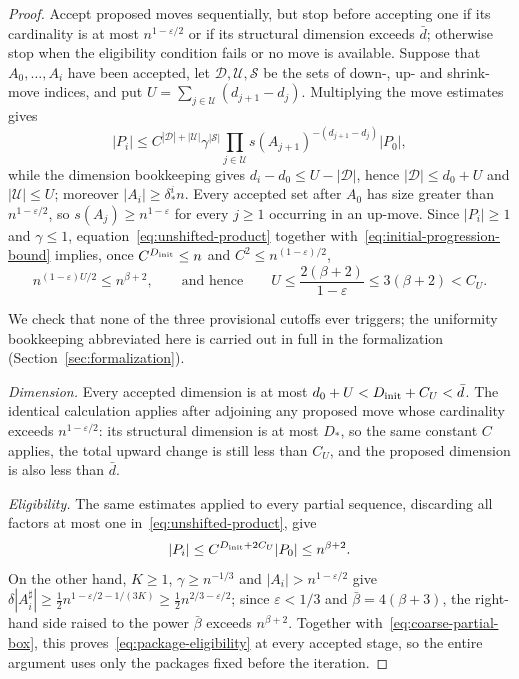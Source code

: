 \documentclass[11pt,reqno]{amsart}
\theoremstyle{definition}
\theoremstyle{remark}
\newcommand{\eps}{\varepsilon}
\begin{document}
\begin{proof}
Accept proposed moves sequentially, but stop before accepting one if its
cardinality is at most $n^{1-\eps/2}$ or if its structural dimension
exceeds $\bar d$; otherwise stop when the eligibility condition fails or
no move is available.  Suppose that $A_0,\dots,A_i$ have been accepted,
let $\mathcal D,\mathcal U,\mathcal S$ be the sets of down-, up- and
shrink-move indices, and put $U=\sum_{j\in\mathcal U}(d_{j+1}-d_j)$.
Multiplying the move estimates gives
\begin{equation}
\label{eq:unshifted-product}
 |P_i|
 \le C^{|\mathcal D|+|\mathcal U|}
 \gamma^{|\mathcal S|}
 \prod_{j\in\mathcal U}s(A_{j+1})^{-(d_{j+1}-d_j)}|P_0|,
\end{equation}
while the dimension bookkeeping gives $d_i-d_0\le U-|\mathcal D|$, hence
$|\mathcal D|\le d_0+U$ and $|\mathcal U|\le U$; moreover
$|A_i|\ge\delta_*^in$.  Every accepted set after $A_0$ has size greater
than $n^{1-\eps/2}$, so $s(A_j)\ge n^{1-\eps}$ for every $j\ge1$
occurring in an up-move.  Since $|P_i|\ge1$ and $\gamma\le1$,
equation~\eqref{eq:unshifted-product} together
with~\eqref{eq:initial-progression-bound} implies, once
$C^{D_{\rm init}}\le n$ and $C^2\le n^{(1-\eps)/2}$,
\[
 n^{(1-\eps)U/2}\le n^{\beta+2},
 \qquad\text{and hence}\qquad
 U\le\frac{2(\beta+2)}{1-\eps}
 \le3(\beta+2)<C_U.
\]

We check that none of the three provisional cutoffs ever triggers; the
uniformity bookkeeping abbreviated here is carried out in full in the
formalization (Section~\ref{sec:formalization}).

\emph{Dimension.}  Every accepted dimension is at most
$d_0+U<D_{\rm init}+C_U<\bar d$.  The identical calculation applies after
adjoining any proposed move whose cardinality exceeds $n^{1-\eps/2}$: its
structural dimension is at most $D_*$, so the same constant $C$ applies,
the total upward change is still less than $C_U$, and the proposed
dimension is also less than $\bar d$.

\emph{Eligibility.}  The same estimates applied to every partial
sequence, discarding all factors at most one
in~\eqref{eq:unshifted-product}, give
\begin{equation}
\label{eq:coarse-partial-box}
 |P_i|\le C^{D_{\rm init}+2C_U}|P_0|\le n^{\beta+2}.
\end{equation}
On the other hand, $K\ge1$, $\gamma\ge n^{-1/3}$ and $|A_i|>n^{1-\eps/2}$
give
$\delta|A_i^\sharp|\ge\frac12n^{1-\eps/2-1/(3K)}\ge\frac12n^{2/3-\eps/2}$;
since $\eps<1/3$ and $\bar\beta=4(\beta+3)$, the right-hand side raised
to the power $\bar\beta$ exceeds $n^{\beta+2}$.  Together
with~\eqref{eq:coarse-partial-box}, this
proves~\eqref{eq:package-eligibility} at every accepted stage, so the
entire argument uses only the packages fixed before the iteration.


\end{proof}
\end{document}
